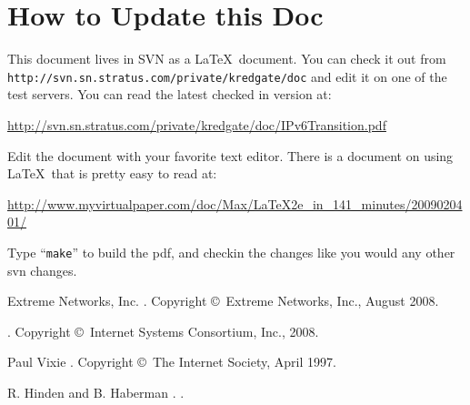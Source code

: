 \documentclass[twoside]{article}
\begin{document}
\section{How to Update this Doc}

This document lives in SVN as a \LaTeX\ document.
You can check it out from \verb+http://svn.sn.stratus.com/private/kredgate/doc+
and edit it on one of the test servers.
You can read the latest checked in version at:

\url{http://svn.sn.stratus.com/private/kredgate/doc/IPv6Transition.pdf}

Edit the document with your favorite text editor.
There is a document on using \LaTeX\ that is pretty easy to read at:

\url{http://www.myvirtualpaper.com/doc/Max/LaTeX2e_in_141_minutes/2009020401/}

Type ``\verb+make+'' to build the pdf, and checkin the changes like you would any other svn changes.



\begin{thebibliography}{99}

   Extreme Networks, Inc.
   .
   \newblock Copyright \copyright~Extreme Networks, Inc., August 2008.\hfil\\

   .
   \newblock Copyright \copyright~Internet Systems Consortium, Inc., 2008.\hfil\\

   Paul Vixie
   .
   \newblock Copyright \copyright~The Internet Society, April 1997.\hfil\\

   R. Hinden and B. Haberman
   .
   .

\end{thebibliography}
\end{document}
